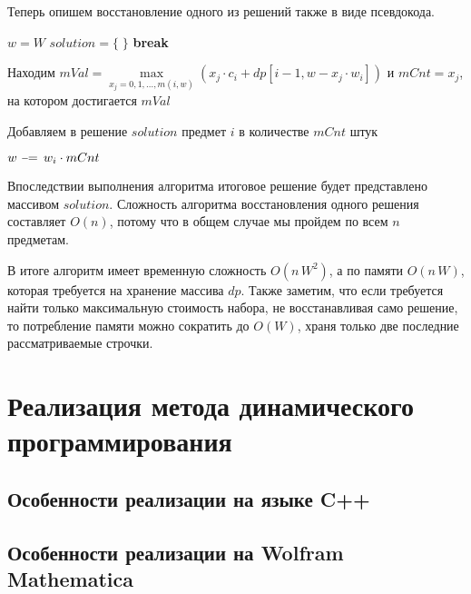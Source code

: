 \documentclass[12pt, a4paper]{article}
\newcommand{\algorithmicbreak}{\textbf{break}}
\newcommand{\Break}{\State \algorithmicbreak}
\begin{document}
	
	Теперь опишем восстановление одного из решений также в виде псевдокода.
	\begin{algorithmic}[1]
		\State $w = W$
		\State $solution = \{\;\}$
		\Break
		\EndIf
		\State \parbox[t]{\dimexpr12cm-\algorithmicindent}{Находим $mVal = \max\limits_{x_j = 0,1,\dots, m(i,w)} \left(x_j\cdot c_i + dp[i-1, w - x_j\cdot w_i]\right)$ и $mCnt = x_j$, на котором достигается $mVal$}
		\If{$mCnt \ne 0$}
		\State \parbox[t]{\dimexpr11.5cm-\algorithmicindent}{Добавляем в решение $solution$ предмет $i$ в количестве $mCnt$ штук}
		\State $w\,\,\scalebox{0.75}[1.0]{\(-\)}\!\!=\, w_i \cdot mCnt$
		\EndIf
		\EndFor
	\end{algorithmic}
	
	Впоследствии выполнения алгоритма итоговое решение будет представлено массивом $solution$. Сложность алгоритма восстановления одного решения составляет $O(n)$, потому что в общем случае мы пройдем по всем $n$ предметам.
	
	В итоге алгоритм имеет временную сложность $O(n\,W^2)$, а по памяти $O(n\,W)$, которая требуется на хранение массива $dp$. Также заметим, что если требуется найти только максимальную стоимость набора, не восстанавливая само решение, то потребление памяти можно сократить до $O(W)$, храня только две последние рассматриваемые строчки.
	
	\section{Реализация метода динамического программирования}
	
	\subsection{Особенности реализации на языке C++}
	
	
	\subsection{Особенности реализации на Wolfram Mathematica}
	
	
\end{document}
